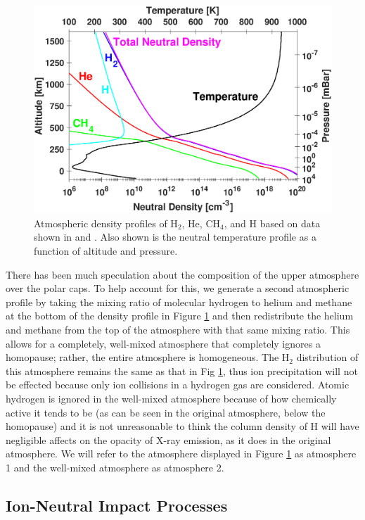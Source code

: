 \documentclass[draft]{agujournal2018}
\begin{document}
\begin{figure}[ht]
\centering
\includegraphics[width=\textwidth]{Figures/Atmosphere.eps}
\caption{Atmospheric density profiles of H$_{2}$, He, CH$_{4}$, and H based on data shown in \citet{maurellis2001} and \citet{sinclair2018}. Also shown is the neutral temperature profile as a function of altitude and pressure.}
\label{fig:atm}
\end{figure}

There has been much speculation about the composition of the upper atmosphere over the polar caps.
To help account for this, we generate a second atmospheric profile by taking the mixing ratio of molecular hydrogen to helium and methane at the bottom of the density profile in Figure \ref{fig:atm} and then redistribute the helium and methane from the top of the atmosphere with that same mixing ratio.
This allows for a completely, well-mixed atmosphere that completely ignores a homopause; rather, the entire atmosphere is homogeneous.
The H$_{2}$ distribution of this atmosphere remains the same as that in Fig \ref{fig:atm}, thus ion precipitation will not be effected because only ion collisions in a hydrogen gas are considered.
Atomic hydrogen is ignored in the well-mixed atmosphere because of how chemically active it tends to be (as can be seen in the original atmosphere, below the homopause) and it is not unreasonable to think the column density of H will have negligible affects on the opacity of X-ray emission, as it does in the original atmosphere.
We will refer to the atmosphere displayed in Figure \ref{fig:atm} as atmosphere 1 and the well-mixed atmosphere as atmosphere 2.

\subsection{Ion-Neutral Impact Processes}
\end{document}
